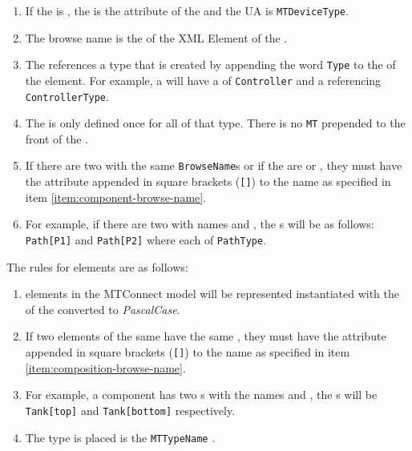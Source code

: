 \begin{enumerate}
  \item If the  is , the  is the  attribute of the  and the UA  is \texttt{MTDeviceType}.
  \item The browse name is the  of the XML Element of the . \label{item:component-browse-name}
  \item The  references a type that is created by appending the word \texttt{Type} to the  of the  element. For example, a  will have a  of \texttt{Controller} and a  referencing \texttt{ControllerType}.
  \item The  is only defined once for all  of that type. There is no \texttt{MT} prepended to the front of the  .
  \item If there are two  with the same \texttt{BrowseName}s or if the  are  or , they must have the  attribute appended in square brackets (\texttt{[]}) to the name as specified in item \ref{item:component-browse-name}. 
  \item For example, if there are two   with names  and , the s will be as follows: \texttt{Path[P1]} and \texttt{Path[P2]} where each  of \texttt{PathType}.
\end{enumerate}

The rules for  elements are as follows:

\begin{enumerate}
  \item  {} elements in the MTConnect model will be represented instantiated with the  of the   converted to \textit{PascalCase}. \label{item:composition-browse-name}
  \item If two  elements of the same  have the same , they must have the  attribute appended in square brackets (\texttt{[]}) to the name as specified in item \ref{item:composition-browse-name}.
  \item For example, a component has two s with the names  and , the s will be \texttt{Tank[top]} and \texttt{Tank[bottom]} respectively.
  \item The type is placed is the \texttt{MTTypeName} .
\end{enumerate}

